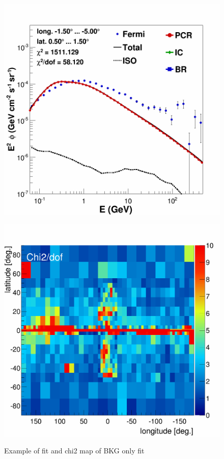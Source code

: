 \begin{figure}[h]
  \centering
  \begin{minipage}[h]{0.45\textwidth}
  	\centering
	\includegraphics[width=1.\linewidth]{pic/results/BKGonly_CMZ.png}
  	\label{fig:bkgd_only_spectrum}
  \end{minipage}
  \hfill
  \begin{minipage}[h]{0.45\textwidth}
	  \centering
	  \includegraphics[width=1.\linewidth]{pic/results/chi2_distribution_BKGonly.png}
	  \label{fig:BKGonly_chi2Distribution}
  \end{minipage}
  \caption{Example of fit and chi2 map of BKG only fit}
  \label{}	 
\end{figure}


